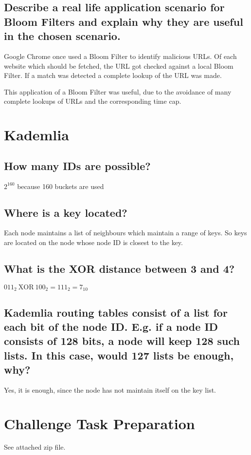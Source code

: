 \documentclass{article}
\begin{document}
\subsection{Describe a real life application scenario for Bloom
Filters and explain why they are useful in the chosen scenario.}

  Google Chrome once used a Bloom Filter to identify malicious URLs. Of each
  website which should be fetched, the URL got checked against a local Bloom Filter.
  If a match was detected a complete lookup of the URL was made.

  This application of a Bloom Filter was useful, due to the avoidance of
  many complete lookups of URLs and the corresponding time cap.


\section{Kademlia}

\subsection{How many IDs are possible?}

  $2^{160}$ because 160 buckets are used

\subsection{Where is a key located?}

  Each node maintains a list of neighbours which maintain a range of keys.
  So keys are located on the node whose node ID is closest to the key.

\subsection{What is the XOR distance between 3 and 4?}

  ${011}_2\ \text{XOR}\ {100}_2 = {111}_2 = 7_{10}$

\subsection{Kademlia routing tables consist of a list for each bit of the node ID. E.g. if
a node ID consists of 128 bits, a node will keep 128 such lists. In this case, would 127
lists be enough, why?}

  Yes, it is enough, since the node has not maintain itself on the key list.

\section{Challenge Task Preparation}
See attached zip file.



\end{document}
